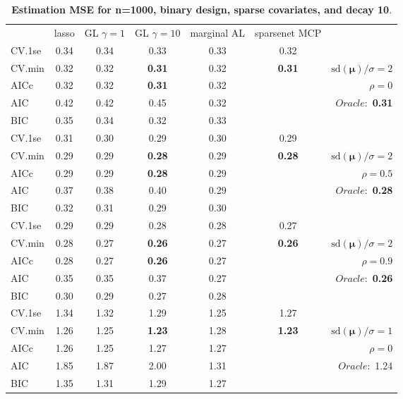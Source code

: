 \clearpage
\begin{table}\vspace{-.5cm}
\caption[l]{ { \bf Estimation MSE for n=1000, binary design, 
sparse covariates, and  decay  10}.}
\vspace{-.5cm}
\footnotesize{}
\begin{center}
\begin{tabular}{l*{5}{c}|r}
& lasso & GL $\gamma=1$ & GL $\gamma=10$ & marginal AL & sparsenet MCP  & \\
 \cline{1-7}
CV.1se & 0.34 & 0.34 & 0.33 & 0.33 & 0.32 & \\
CV.min & 0.32 & 0.32 & {\bf 0.31} & 0.32 & {\bf 0.31} &  $\mathrm{sd}(\mathbf{\mu})/\sigma=2$ \\
AICc & 0.32 & 0.32 & {\bf 0.31} & 0.32 & & $\rho=0$ \\
AIC & 0.42 & 0.42 & 0.45 & 0.32 & &  \multirow{2}{*}{$Oracle: $ {\bf 0.31}} \\
BIC & 0.35 & 0.34 & 0.32 & 0.33 & &  \\
 \hline 
CV.1se & 0.31 & 0.30 & 0.29 & 0.30 & 0.29 & \\
CV.min & 0.29 & 0.29 & {\bf 0.28} & 0.29 & {\bf 0.28} &  $\mathrm{sd}(\mathbf{\mu})/\sigma=2$ \\
AICc & 0.29 & 0.29 & {\bf 0.28} & 0.29 & & $\rho=0.5$ \\
AIC & 0.37 & 0.38 & 0.40 & 0.29 & &  \multirow{2}{*}{$Oracle: $ {\bf 0.28}} \\
BIC & 0.32 & 0.31 & 0.29 & 0.30 & &  \\
 \hline 
CV.1se & 0.29 & 0.29 & 0.28 & 0.28 & 0.27 & \\
CV.min & 0.28 & 0.27 & {\bf 0.26} & 0.27 & {\bf 0.26} &  $\mathrm{sd}(\mathbf{\mu})/\sigma=2$ \\
AICc & 0.28 & 0.27 & {\bf 0.26} & 0.27 & & $\rho=0.9$ \\
AIC & 0.35 & 0.35 & 0.37 & 0.27 & &  \multirow{2}{*}{$Oracle: $ {\bf 0.26}} \\
BIC & 0.30 & 0.29 & 0.27 & 0.28 & &  \\
 \hline 
CV.1se & 1.34 & 1.32 & 1.29 & 1.25 & 1.27 & \\
CV.min & 1.26 & 1.25 & {\bf 1.23} & 1.28 & {\bf 1.23} &  $\mathrm{sd}(\mathbf{\mu})/\sigma=1$ \\
AICc & 1.26 & 1.25 & 1.27 & 1.27 & & $\rho=0$ \\
AIC & 1.85 & 1.87 & 2.00 & 1.31 & &  \multirow{2}{*}{$Oracle: $ 1.24} \\
BIC & 1.35 & 1.31 & 1.29 & 1.27 & &  \\

\end{tabular}
\end{center}
\end{table}
